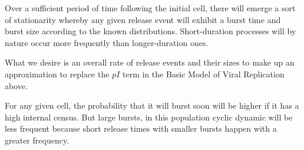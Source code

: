 Over a sufficient period of time following the initial cell, there will emerge a sort of stationarity whereby any given release event will exhibit a burst time and burst size according to the known distributions. Short-duration processes will by nature occur more frequently than longer-duration ones. 


{ What we desire is an overall rate of release events and their sizes to make up an approximation to replace the} $p I $ {term in the Basic Model of Viral Replication above.}


{For any given cell, the probability that it will burst soon will be higher if it has a high internal census. But large bursts, in this population cyclic dynamic will be less frequent because short release times with smaller bursts happen with a greater frequency. }
